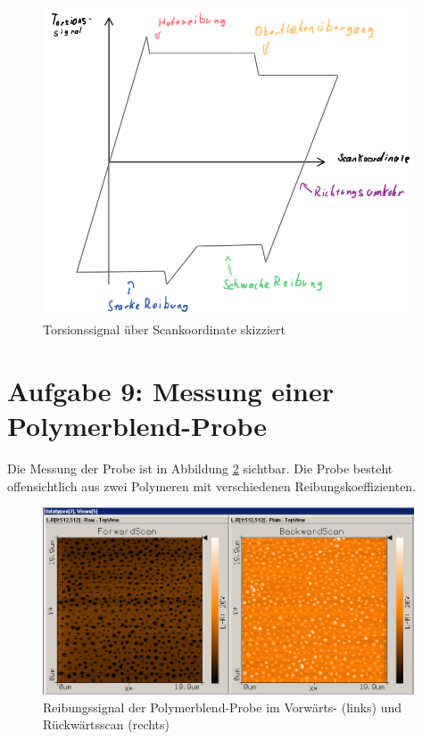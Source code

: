 \begin{figure}[H]
    \centering
    \includegraphics[width=110mm,scale=0.5]{Rasterkraftmikroskop/include/bild-3.png}
    \caption{Torsionssignal über Scankoordinate skizziert} 
    \label{fig:gedankenex}
\end{figure}

\section{Aufgabe 9: Messung einer Polymerblend-Probe}

Die Messung der Probe ist in Abbildung \ref{fig:poly} sichtbar. 
Die Probe besteht offensichtlich aus zwei Polymeren mit verschiedenen Reibungskoeffizienten. 

\begin{figure}[b]
    \centering
    \includegraphics[width=110mm,scale=0.5]{Rasterkraftmikroskop/Daten/A9.png}
    \caption{Reibungssignal der Polymerblend-Probe im Vorwärts- (links) und Rückwärtsscan (rechts)} 
    \label{fig:poly}
\end{figure}

